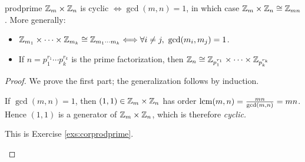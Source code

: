 \begin{cor}{}{prodprime}
	$\mathbb{Z}_m\times\mathbb{Z}_n$ is cyclic $\Longleftrightarrow \gcd(m,n)=1$, in which case $\mathbb{Z}_m\times\mathbb{Z}_n\cong\mathbb{Z}_{mn}$.\smallbreak
	More generally:
	\begin{itemize}\itemsep0pt
	  \item $\Z_{m_1}\times\cdots\times\Z_{m_k}\cong\Z_{m_1\cdots m_k} \Longleftrightarrow \forall i\neq j,\ \gcd(m_i,m_j)=1$.
	  \item If $n=p_1^{r_1}\cdots p_k^{r_k}$ is the prime factorization, then
	$\mathbb{Z}_n\cong\mathbb{Z}_{p_1^{r_1}}\times\cdots\times\mathbb{Z}_{p_k^{r_k}}$
	\end{itemize} 
\end{cor}

\begin{proof}
	We prove the first part; the generalization follows by induction.
	\begin{description}\itemsep0pt
		\item[\normalfont ($\Leftarrow$)] If $\gcd(m,n)=1$, then $(1,1)\in\mathbb{Z}_m\times\mathbb{Z}_n$ has order $\operatorname{lcm}(m,n)=\frac{mn}{\gcd(m,n)} =mn$. Hence $(1,1)$ is a generator of $\mathbb{Z}_m\times\mathbb{Z}_n$, which is therefore \emph{cyclic.}
		\item[\normalfont ($\Rightarrow$)] This is Exercise \ref{exs:corprodprime}.\qedhere
	\end{description}
\end{proof}


